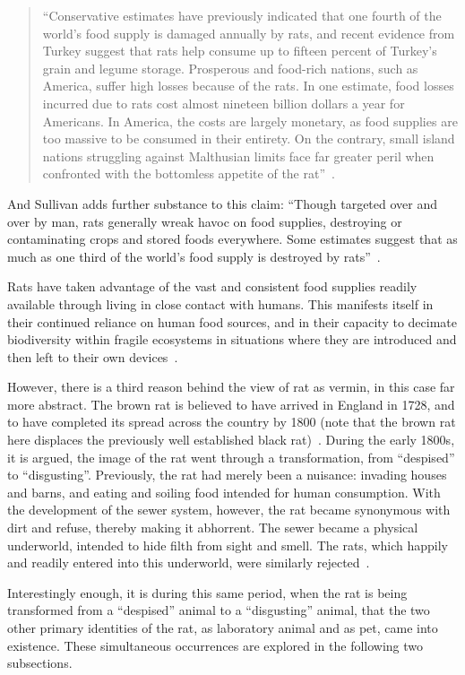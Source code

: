 \documentclass[12pt]{article}
\begin{document}
\begin{quote}
``Conservative estimates have previously indicated that one fourth of the world’s food supply is damaged annually by rats, and recent evidence from Turkey suggest that rats help consume up to fifteen percent of Turkey’s grain and legume storage. Prosperous and food-rich nations, such as America, suffer high losses because of the rats. In one estimate, food losses incurred due to rats cost almost nineteen billion dollars a year for Americans. In America, the costs are largely monetary, as food supplies are too massive to be consumed in their entirety. On the contrary, small island nations struggling against Malthusian limits face far greater peril when confronted with the bottomless appetite of the rat''~\cite{ONeill}.
\end{quote}

And Sullivan adds further substance to this claim: ``Though targeted over and over by man, rats generally wreak havoc on food supplies, destroying or contaminating crops and stored foods everywhere. Some estimates suggest that as much as one third of the world's food supply is destroyed by rats''~\cite{Sullivan2004}.

Rats have taken advantage of the vast and consistent food supplies readily available through living in close contact with humans. This manifests itself in their continued reliance on human food sources, and in their capacity to decimate biodiversity within fragile ecosystems in situations where they are introduced and then left to their own devices~\cite{ONeill}.

However, there is a third reason behind the view of rat as vermin, in this case far more abstract. The brown rat is believed to have arrived in England in 1728, and to have completed its spread across the country by 1800 (note that the brown rat here displaces the previously well established black rat)~\cite{Edelman2002}. During the early 1800s, it is argued, the image of the rat went through a transformation, from ``despised'' to ``disgusting''. Previously, the rat had merely been a nuisance: invading houses and barns, and eating and soiling food intended for human consumption. With the development of the sewer system, however, the rat became synonymous with dirt and refuse, thereby making it abhorrent. The sewer became a physical underworld, intended to hide filth from sight and smell. The rats, which happily and readily entered into this underworld, were similarly rejected~\cite{Edelman2005}.

Interestingly enough, it is during this same period, when the rat is being transformed from a ``despised'' animal to a ``disgusting'' animal, that the two other primary identities of the rat, as laboratory animal and as pet, came into existence. These simultaneous occurrences are explored in the following two subsections.
\end{document}
